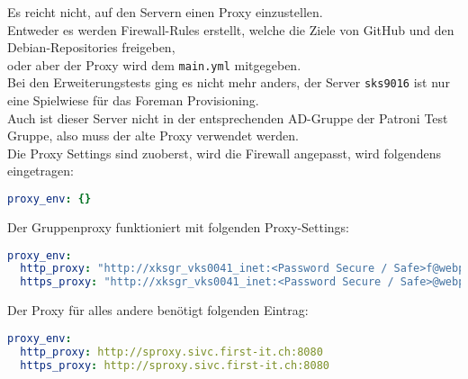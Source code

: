 \begin{flushleft}
    Es reicht nicht, auf den Servern einen Proxy einzustellen.\\
    Entweder es werden Firewall-Rules erstellt, welche die Ziele von \Gls{GitHub} und den \Gls{Debian}-Repositories freigeben,\\
    oder aber der Proxy wird dem \texttt{main.yml} mitgegeben.\\
    Bei den Erweiterungstests ging es nicht mehr anders, der Server \texttt{sks9016} ist nur eine Spielwiese für das \Gls{Foreman} Provisioning.\\
    Auch ist dieser Server nicht in der entsprechenden AD-Gruppe der Patroni Test Gruppe, also muss der alte Proxy verwendet werden.\\
    Die Proxy Settings sind zuoberst, wird die Firewall angepasst, wird folgendens eingetragen:
    \lstset{style=gra_codestyle}
    \begin{lstlisting}[language=yaml, caption=main.xyml - No Proxy,captionpos=b,label={lst:main.yml-no-proxy},breaklines=true]
proxy_env: {}
    \end{lstlisting}
    Der Gruppenproxy funktioniert mit folgenden Proxy-Settings:
    \lstset{style=gra_codestyle}
    \begin{lstlisting}[language=yaml, caption=main.xyml - Gruppenproxy,captionpos=b,label={lst:main.yml-webproxy},breaklines=true]
proxy_env:
  http_proxy: "http://xksgr_vks0041_inet:<Password Secure / Safe>f@webproxy.sivc.first-it.ch:9090"
  https_proxy: "http://xksgr_vks0041_inet:<Password Secure / Safe>@webproxy.sivc.first-it.ch:9090"
    \end{lstlisting}
    Der Proxy für alles andere benötigt folgenden Eintrag:
    \lstset{style=gra_codestyle}
    \begin{lstlisting}[language=yaml, caption=main.xyml - SProxy,captionpos=b,label={lst:main.yml-sproxy},breaklines=true]
proxy_env:
  http_proxy: http://sproxy.sivc.first-it.ch:8080
  https_proxy: http://sproxy.sivc.first-it.ch:8080
    \end{lstlisting}
\end{flushleft}
